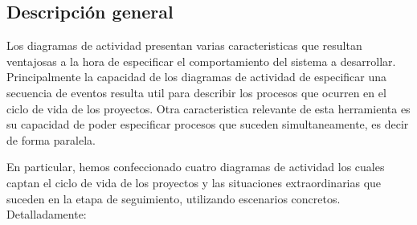 \subsection{Descripción general}
Los diagramas de actividad presentan varias caracteristicas que resultan ventajosas a la hora de especificar el comportamiento del sistema a desarrollar.
Principalmente la capacidad de los diagramas de actividad de especificar una secuencia de eventos resulta util para describir los procesos que ocurren en el ciclo de vida de los proyectos. Otra caracteristica relevante de esta herramienta es su capacidad de poder especificar procesos que suceden simultaneamente, es decir de forma paralela.

En particular, hemos confeccionado cuatro diagramas de actividad los cuales captan el ciclo de vida de los proyectos y las situaciones extraordinarias que suceden en la etapa de seguimiento, utilizando escenarios concretos. Detalladamente:

